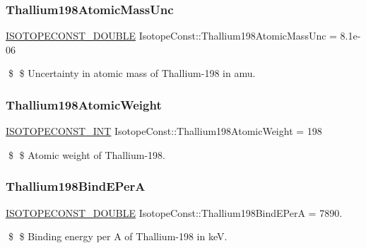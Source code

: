 \subsubsection{\texorpdfstring{Thallium198\+Atomic\+Mass\+Unc}{Thallium198AtomicMassUnc}}
{\footnotesize\ttfamily \mbox{\hyperlink{group___isotope_const-_macros_ga8f45a7272ce02c0b4c65c44636ed719a}{I\+S\+O\+T\+O\+P\+E\+C\+O\+N\+S\+T\+\_\+\+D\+O\+U\+B\+LE}} Isotope\+Const\+::\+Thallium198\+Atomic\+Mass\+Unc = 8.\+1e-\/06}

\$ \$ Uncertainty in atomic mass of Thallium-\/198 in amu. \mbox{\label{group___isotope_const-_thallium-_tl198_ga1378388e452a74f6c933116f8b3b81ee}} 
\subsubsection{\texorpdfstring{Thallium198\+Atomic\+Weight}{Thallium198AtomicWeight}}
{\footnotesize\ttfamily \mbox{\hyperlink{group___isotope_const-_macros_ga5f18360b3e99483a35c32d789e62621c}{I\+S\+O\+T\+O\+P\+E\+C\+O\+N\+S\+T\+\_\+\+I\+NT}} Isotope\+Const\+::\+Thallium198\+Atomic\+Weight = 198}

\$ \$ Atomic weight of Thallium-\/198. \mbox{\label{group___isotope_const-_thallium-_tl198_ga6eea6e0d2868a86f4502feb39d174e3e}} 
\subsubsection{\texorpdfstring{Thallium198\+Bind\+E\+PerA}{Thallium198BindEPerA}}
{\footnotesize\ttfamily \mbox{\hyperlink{group___isotope_const-_macros_ga8f45a7272ce02c0b4c65c44636ed719a}{I\+S\+O\+T\+O\+P\+E\+C\+O\+N\+S\+T\+\_\+\+D\+O\+U\+B\+LE}} Isotope\+Const\+::\+Thallium198\+Bind\+E\+PerA = 7890.}

\$ \$ Binding energy per A of Thallium-\/198 in keV. \mbox{\label{group___isotope_const-_thallium-_tl198_gabbb5b36f3d764b7b9e417083a9909baa}} 
